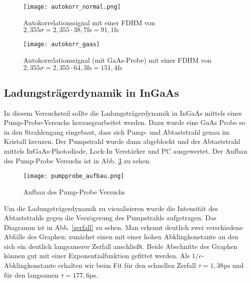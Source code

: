 \begin{figure}[H]
	\begin{center}
		\texttt{[image: autokorr\_normal.png]}
		\caption{Autokorrelationssignal mit einer FDHM von $2,355\sigma=2,355\cdot 38,7\si{\femto\second}=91,1\si{\femto\second}$}
		\label{autokorr_normal}
	\end{center}
\end{figure}
	
\begin{figure}[H]
	\begin{center}
		\texttt{[image: autokorr\_gaas]}
		\caption{Autokorrelationssignal (mit GaAs-Probe) mit einer FDHM von $2,355\sigma=2,355\cdot 64,3\si{\femto\second}=151,4\si{\femto\second}$}
		\label{autokorr_gaas}
	\end{center}
\end{figure}
	
\subsection{Ladungsträgerdynamik in InGaAs}	
In diesem Versuchsteil sollte die Ladungsträgerdynamik in InGaAs mittels eines Pump-Probe-Versuchs herausgearbeitet werden. Dazu wurde eine GaAs Probe so in den Strahlengang eingebaut, dass sich Pump- und Abtaststrahl genau im Kristall kreuzen. Der Pumpstrahl wurde dann abgeblockt und der Abtaststrahl mittels InGaAs-Photodiode, Lock-In Verstärker und PC ausgewertet. Der Aufbau des Pump-Probe Versuchs ist in Abb. \ref{pp_aufbau} zu sehen.

\begin{figure}[h]
	\begin{center}
		\texttt{[image: pumpprobe\_aufbau.png]}
		\caption{Aufbau des Pump-Probe Versuchs}
		\label{pp_aufbau}
	\end{center}
\end{figure}

Um die Ladungsträgerdynamik zu visualisieren wurde die Intensität des Abtaststrahls gegen die Verzögerung des Pumpstrahls aufgetragen. Das Diagramm ist in Abb. \ref{zerfall} zu sehen. Man erkennt deutlich zwei verschiedene Abfälle des Graphen: zunächst einen mit einer hohen Abklingkonstante an den sich ein deutlich langsamerer Zerfall anschließt. Beide Abschnitte des Graphen können gut mit einer Exponentialfunktion gefittet werden. Als $1/e$-Abklingkonstante erhalten wir beim Fit für den schnellen Zerfall $\tau=1,38\si{\pico\second}$ und für den langsamen $\tau=177,6\si{\pico\second}$. 

